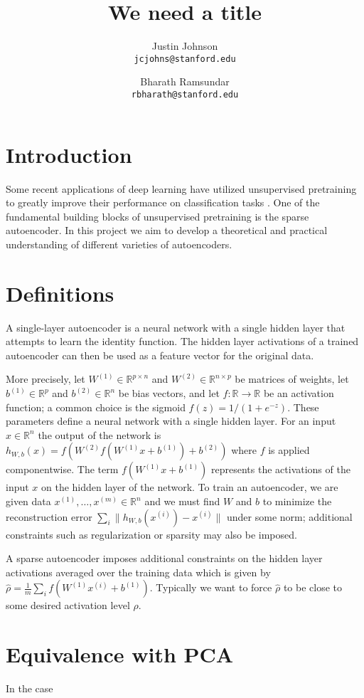 \documentclass[twocolumn]{article}
\title{We need a title}
\author{%
    Justin Johnson \\
    \texttt{jcjohns@stanford.edu}
  \and
    Bharath Ramsundar \\
    \texttt{rbharath@stanford.edu}
}
\date{}
\newcommand{\RR}{\mathbb{R}}
\newcommand{\ra}{\rightarrow}
\newcommand{\Wo}{W^{(1)}}
\newcommand{\Wt}{W^{(2)}}
\newcommand{\bo}{b^{(1)}}
\newcommand{\bt}{b^{(2)}}
\newcommand{\xii}{x^{(i)}}
\begin{document}
\maketitle

\section{Introduction}
Some recent applications of deep learning have utilized unsupervised pretraining to greatly improve
their performance on classification tasks \cite{le2011building}. One of the fundamental building
blocks of unsupervised pretraining is the sparse autoencoder. In this project we aim to develop a
theoretical and practical understanding of different varieties of autoencoders.

\section{Definitions}
A single-layer autoencoder is a neural network with a single hidden layer that attempts to learn
the identity function. The hidden layer activations of a trained autoencoder can then be used as a
feature vector for the original data.

More precisely, let $\Wo\in\RR^{p\times n}$ and $\Wt\in\RR^{n\times p}$ be matrices of
weights, let $\bo\in\RR^p$ and $\bt\in\RR^n$ be bias vectors, and let $f:\RR\ra\RR$ be
an activation function; a common choice is the sigmoid $f(z)=1/(1+e^{-z})$. These parameters
define a neural network with a single hidden layer. For an input $x\in\RR^n$ the output of the
network is $h_{W,b}(x)=f(\Wt f(\Wo x+\bo)+\bt)$ where $f$ is applied componentwise.
The term $f(\Wo x+\bo)$ represents the activations of the input $x$ on the hidden layer of the
network. To train an autoencoder, we are given data $x^{(1)},\ldots,x^{(m)}\in\RR^n$ and we must find
$W$ and $b$ to minimize the reconstruction error $\sum_i\|h_{W,b}(\xii)-\xii\|$ under some norm;
additional constraints such as regularization or sparsity may also be imposed.

A sparse autoencoder imposes additional constraints on the hidden layer activations averaged over
the training data which is given by $\hat\rho=\frac1m\sum_if(\Wo\xii+\bo)$. Typically we want to force
$\hat\rho$ to be close to some desired activation level $\rho$.

\section{Equivalence with PCA}
In the case
\end{document}
